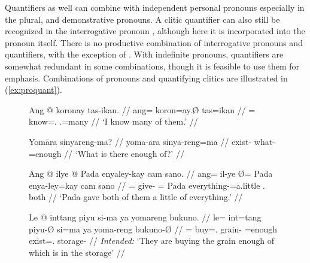 Quantifiers as well can combine with independent personal pronouns especially
in the plural, and demonstrative pronouns. A clitic quantifier can also still
be recognized in the interrogative pronoun ,
although here it is incorporated into the pronoun itself. There is no
productive combination of interrogative pronouns and quantifiers, with the
exception of . With indefinite pronouns, quantifiers are
somewhat redundant in some combinations, though it is feasible to use them for
emphasis. Combinations of pronouns and quantifying clitics are illustrated in
(\ref{ex:proquant}).

\begin{figure}
\pex\label{ex:proquant}
\a\label{ex:proquant_perspro}\begingl
	\gla Ang @ koronay tas-ikan. //
	\glb ang= koron=ay.Ø tas=ikan //
	\glc \AgtT{}= know=\Fsg{}.\Top{} \TplM{}.\Parg{}=many //
	\glft `I know many of them.' //
\endgl


\a\label{ex:proquant_interpro}\begingl
	\gla Yomāra sinyareng-ma? //
	\glb yoma-ara sinya-reng=ma //
	\glc exist-\TsgI{} what-\AargI{}=enough //
	\glft `What is there enough of?' //
\endgl

\a\label{ex:proquant_indefpro_1}\begingl
	\gla Ang @ ilye {} @ Pada enyaley-kay cam sano. //
	\glb ang= il-ye Ø= Pada enya-ley=kay cam sano //
	\glc \Aarg{}= give-\TsgF{} \Top{}= Pada everything-\PargI{}=a.little 
		\TplM{}.\Dat{} both //
	\glft `Pada gave both of them a little of everything.' //
\endgl


\a\label{ex:proquant_relpro}\ljudge*\begingl
	\gla Le @ inttang piyu si-ma ya yomareng bukuno. //
	\glb le= int=tang piyu-Ø si=ma ya yoma-reng bukuno-Ø //
	\glc \PargI{}= buy=\TplM{}.\Aarg{} grain-\Top{} \Rel{}=enough \LocT{}
	exist=\TsgI{}.\Aarg{} storage-\Top{} //
	\glft \textit{Intended:} `They are buying the grain enough of which is 
		in the storage' //
\endgl

\xe
\end{figure}

